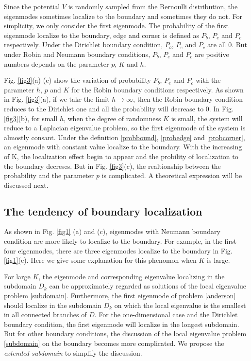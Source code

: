 \documentclass[a4paper,11pt]{article}
\begin{document}
Since the potential $V$ is randomly sampled from the Bernoulli distribution, the eigenmodes sometimes localize to the boundary and sometimes they do not. For simplicity, we only consider the first eigenmode. The probability of the first eigenmode localize to the boundary, edge and corner is defined as $P_b$, $P_e$ and $P_c$ respectively. Under the Dirichlet boundary condition, $P_b$, $P_e$ and $P_c$ are all $0$. But under Robin and Neumann boundary conditions, $P_b$, $P_e$ and $P_c$ are positive numbers depends on the parameter $p$, $K$ and $h$.

Fig. \ref{fig3}(a)-(c) show the variation of probability $P_b$, $P_e$ and $P_c$ with the parameter $h$, $p$ and $K$ for the Robin boundary conditions respectively. As shown in Fig. \ref{fig3}(a), if we take the limit $h \rightarrow \infty$, then the Robin boundary condition reduces to the Dirichlet one and all the probability will decrease to $0$. In Fig. \ref{fig3}(b), for small $h$, when the degree of randomness $K$ is small, the system will reduce to a Laplacian eigenvalue problem, so the first eigenmode of the system is almostly consant. Under the definition \eqref{probbound}, \eqref{probedge} and \eqref{probcorner}, an eigenmode with constant value localize to the boundary. With the increasing of K, the localization effect begin to appear and the probility of localization to the boundary decreses. But in Fig. \ref{fig3}(c), the realtionship between the probability and the parameter $p$ is complicated. A theoretical expression will be discussed next.

\subsection{The tendency of boundary localization}

As shown in Fig. \ref{fig1} (a) and (c), eigenmodes with Neumann boundary condition are more likely to localize to the boundary. For example, in the first four eigenmodes, there are three eigenmodes localize to the boundary in Fig. \ref{fig1}(c). Here we give some explanation for this phenomon when $K$ is large.

For large $K$, the eigenmode and corresponding eigenvalue localizing in the subdomain $D_k$ can be approximately regarded as solutions of the local eigenvalue problem \eqref{subdomain}. Furthermore, the first eigenmode of problem \eqref{anderson} should localize in the subdomain $D_k$ on which the local eigenvalue is the smallest in all connected branches of $D$. For the one-dimensional case and the Dirichlet boundary condition, the first eigenmode will localize in the longest subdomain. But for other boundary conditions, the discussion of the local eigenvalue problem \eqref{subdomain} on the boundary becomes more complicated. We propose the \emph{extended subdomain} to simplify the discussion.
\end{document}
